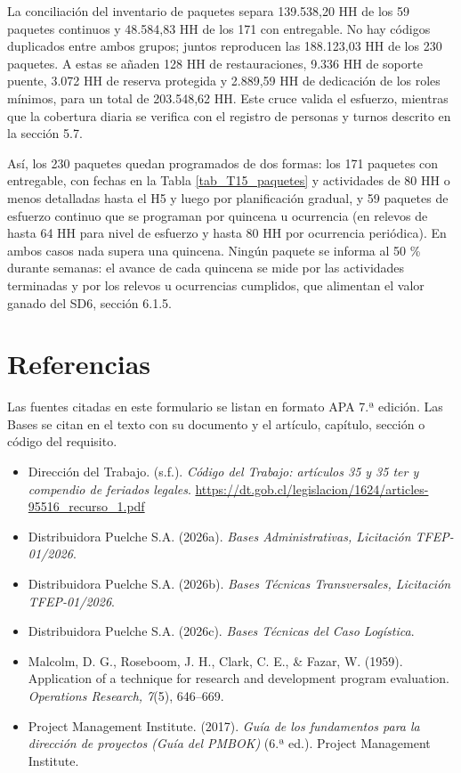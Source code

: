 La conciliación del inventario de paquetes separa 139.538,20 HH de los 59 paquetes continuos y 48.584,83 HH de los 171 con entregable. No hay códigos duplicados entre ambos grupos; juntos reproducen las 188.123,03 HH de los 230 paquetes. A estas se añaden 128 HH de restauraciones, 9.336 HH de soporte puente, 3.072 HH de reserva protegida y 2.889,59 HH de dedicación de los roles mínimos, para un total de 203.548,62 HH. Este cruce valida el esfuerzo, mientras que la cobertura diaria se verifica con el registro de personas y turnos descrito en la sección 5.7.


Así, los 230 paquetes quedan programados de dos formas: los 171 paquetes con entregable, con fechas en la Tabla \ref{tab_T15_paquetes} y actividades de 80 HH o menos detalladas hasta el H5 y luego por planificación gradual, y 59 paquetes de esfuerzo continuo que se programan por quincena u ocurrencia (en relevos de hasta 64 HH para nivel de esfuerzo y hasta 80 HH por ocurrencia periódica). En ambos casos nada supera una quincena. Ningún paquete se informa al 50 \% durante semanas: el avance de cada quincena se mide por las actividades terminadas y por los relevos u ocurrencias cumplidos, que alimentan el valor ganado del SD6, sección 6.1.5.



\section*{Referencias}
{}

Las fuentes citadas en este formulario se listan en formato APA 7.ª edición. Las Bases se citan en el texto con su documento y el artículo, capítulo, sección o código del requisito.

\begin{itemize}
\item Dirección del Trabajo. (s.f.). \emph{Código del Trabajo: artículos 35 y 35 ter y compendio de feriados legales}. \url{https://dt.gob.cl/legislacion/1624/articles-95516_recurso_1.pdf}
\item Distribuidora Puelche S.A. (2026a). \emph{Bases Administrativas, Licitación TFEP-01/2026}.
\item Distribuidora Puelche S.A. (2026b). \emph{Bases Técnicas Transversales, Licitación TFEP-01/2026}.
\item Distribuidora Puelche S.A. (2026c). \emph{Bases Técnicas del Caso Logística}.
\item Malcolm, D. G., Roseboom, J. H., Clark, C. E., \& Fazar, W. (1959). Application of a technique for research and development program evaluation. \emph{Operations Research, 7}(5), 646–669.
\item Project Management Institute. (2017). \emph{Guía de los fundamentos para la dirección de proyectos (Guía del PMBOK)} (6.ª ed.). Project Management Institute.

\end{itemize}
